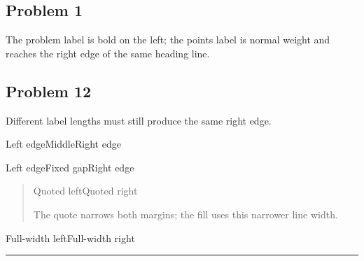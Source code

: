 \documentclass[11pt]{article}
\newcommand{\problem}[2]{\subsection*{Problem #1\quad\normalfont[#2 points]}}
\begin{document}
\pagestyle{empty}
\problem{1}{4}
The problem label is bold on the left; the points label is normal weight
and reaches the right edge of the same heading line.
\problem{12}{15}
Different label lengths must still produce the same right edge.

\noindent Left edge\hfill Middle\hfill Right edge\par
\noindent Left edge\hspace{1em}Fixed gap\hfill Right edge\par
\begin{quote}
Quoted left\hfill Quoted right\par
The quote narrows both margins; the fill uses this narrower line width.
\end{quote}
\noindent Full-width left\hfill Full-width right\par
\hrule
\end{document}
